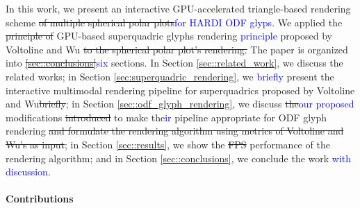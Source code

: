 \documentclass[twoside,twocolumn,10pt]{article}
\begin{document}

In this work, we present an interactive GPU-accelerated triangle-based rendering scheme \sout{of multiple spherical polar plots}\textcolor{blue}{for HARDI ODF glyps}. We applied the \sout{principle of} GPU-based superquadric glyphs rendering \textcolor{blue}{principle} proposed by Voltoline and Wu \cite{voltoline2021}\sout{ to the spherical polar plot's rendering.}
The paper is organized into \sout{\ref{sec::conclusions}}\textcolor{blue}{six} sections. In Section \ref{sec::related_work}, we discuss the related works; in Section \ref{sec:superquadric_rendering}, we \textcolor{blue}{briefly} present the interactive multimodal rendering pipeline for superquadrics proposed by Voltoline and Wu\sout{briefly}; in Section \ref{sec::odf_glyph_rendering}, we discuss \sout{the}\textcolor{blue}{our proposed} modifications \sout{introduced} to make the\textcolor{blue}{ir} pipeline appropriate for ODF glyph rendering\sout{ and formulate the rendering algorithm using metrics of Voltoline and Wu's as input}; in Section \ref{sec::results}, we show the \sout{FPS} performance of the rendering algorithm; and in Section \ref{sec::conclusions}, we conclude the work \textcolor{blue}{with discussion}.

\paragraph*{\textbf{Contributions}}
\end{document}
